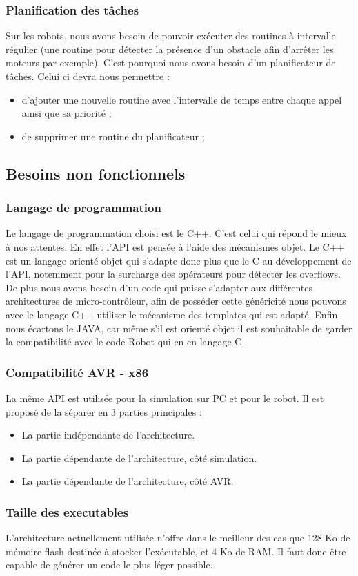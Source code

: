 \subsubsection{Planification des tâches}

Sur les robots, nous avons besoin de pouvoir exécuter des routines à intervalle régulier (une routine pour détecter la présence d'un obstacle afin d'arrêter les moteurs par exemple). C'est pourquoi nous avons besoin d'un planificateur de tâches. Celui ci devra nous permettre :
\begin{itemize}
    \item d'ajouter une nouvelle routine avec l'intervalle de temps entre chaque appel ainsi que sa priorité ;
    \item de supprimer une routine du planificateur ;
\end{itemize}

\subsection{Besoins non fonctionnels}

\subsubsection{Langage de programmation}

Le langage de programmation choisi est le C++. C'est celui qui répond le mieux à nos attentes. En effet l'API est pensée à l'aide des mécanismes objet. Le C++ est un langage orienté objet qui s'adapte donc plus que le C au développement de l'API, notemment pour la surcharge des opérateurs pour détecter les overflows. De plus nous avons besoin d'un code qui puisse s'adapter aux différentes architectures de micro-contrôleur, afin de posséder cette généricité nous pouvons avec le langage C++ utiliser le mécanisme des \og templates \fg qui est adapté. Enfin nous écartons le JAVA, car même s'il est orienté objet il est souhaitable de garder la compatibilité avec le code Robot qui en en langage C.

\subsubsection{Compatibilité AVR - x86}

La même API est utilisée pour la simulation sur PC et pour le robot. Il est proposé de la séparer en 3 parties principales :
\begin{itemize}
    \item{La partie indépendante de l'architecture.}
    \item{La partie dépendante de l'architecture, côté simulation.}
    \item{La partie dépendante de l'architecture, côté AVR.}
\end{itemize}

\subsubsection{Taille des executables}

L'architecture actuellement utilisée n'offre dans le meilleur des cas que 128 Ko de mémoire flash destinée à stocker l'exécutable, et 4 Ko de RAM. Il faut donc être capable de générer un code le plus léger possible.


